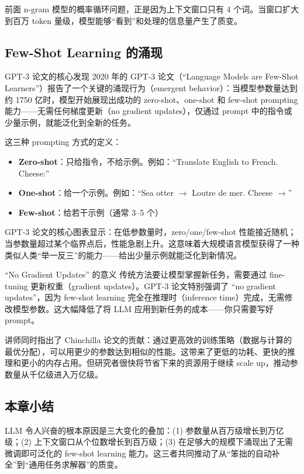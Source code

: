 前面 n-gram 模型的概率循环问题，正是因为上下文窗口只有 4 个词。当窗口扩大到百万 token 量级，模型能够``看到''和处理的信息量产生了质变。

\subsection{Few-Shot Learning 的涌现}

\begin{importantbox}{GPT-3 论文的核心发现}
2020 年的 GPT-3 论文（``Language Models are Few-Shot Learners''）报告了一个关键的涌现行为（emergent behavior）：当模型参数量达到约 1750 亿时，模型开始展现出成功的 zero-shot、one-shot 和 few-shot prompting 能力——无需任何梯度更新（no gradient updates），仅通过 prompt 中的指令或少量示例，就能泛化到全新的任务。
\end{importantbox}

这三种 prompting 方式的定义：

\begin{itemize}
    \item \textbf{Zero-shot}：只给指令，不给示例。例如：``Translate English to French. Cheese:''
    \item \textbf{One-shot}：给一个示例。例如：``Sea otter $\rightarrow$ Loutre de mer. Cheese $\rightarrow$''
    \item \textbf{Few-shot}：给若干示例（通常 3--5 个）
\end{itemize}

GPT-3 论文的核心图表显示：在低参数量时，zero/one/few-shot 性能接近随机；当参数量超过某个临界点后，性能急剧上升。这意味着大规模语言模型获得了一种类似人类``举一反三''的能力——给出少量示例就能泛化到新情况。

\begin{knowledgebox}{``No Gradient Updates'' 的意义}
传统方法要让模型掌握新任务，需要通过 fine-tuning 更新权重（gradient updates）。GPT-3 论文特别强调了 ``no gradient updates''，因为 few-shot learning 完全在推理时（inference time）完成，无需修改模型参数。这大幅降低了将 LLM 应用到新任务的成本——你只需要写好 prompt。
\end{knowledgebox}

讲师同时指出了 Chinchilla 论文的贡献：通过更高效的训练策略（数据与计算的最优分配），可以用更少的参数达到相似的性能。这带来了更低的功耗、更快的推理和更小的内存占用。但研究者很快将节省下来的资源用于继续 scale up，推动参数量从千亿级进入万亿级。

\subsection{本章小结}

LLM 令人兴奋的根本原因是三大变化的叠加：(1) 参数量从百万级增长到万亿级；(2) 上下文窗口从个位数增长到百万级；(3) 在足够大的规模下涌现出了无需微调即可泛化的 few-shot learning 能力。这三者共同推动了从``笨拙的自动补全''到``通用任务求解器''的质变。

